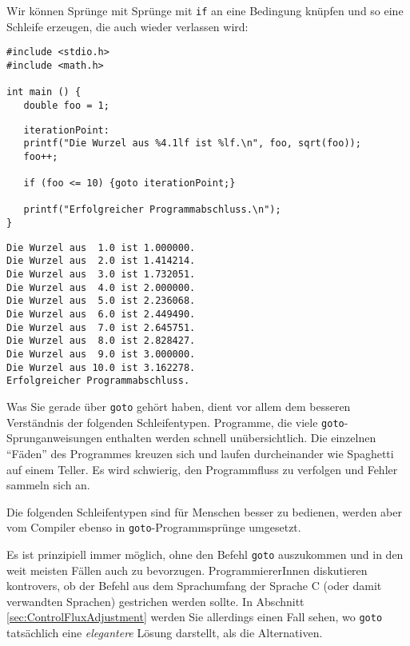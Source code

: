 Wir können Sprünge mit Sprünge mit \texttt{if} an eine Bedingung knüpfen und so eine Schleife erzeugen, die auch wieder verlassen wird:

\begin{codebox}
\begin{verbatim}
#include <stdio.h>
#include <math.h>

int main () {
   double foo = 1;
\end{verbatim}
\end{codebox}
%
\begin{codebox}[]
\begin{verbatim}
   iterationPoint:
   printf("Die Wurzel aus %4.1lf ist %lf.\n", foo, sqrt(foo));
   foo++;
   
   if (foo <= 10) {goto iterationPoint;}
   
   printf("Erfolgreicher Programmabschluss.\n");
}
\end{verbatim}
\end{codebox}

\begin{cmdbox}
\begin{verbatim}
Die Wurzel aus  1.0 ist 1.000000.
Die Wurzel aus  2.0 ist 1.414214.
Die Wurzel aus  3.0 ist 1.732051.
Die Wurzel aus  4.0 ist 2.000000.
Die Wurzel aus  5.0 ist 2.236068.
Die Wurzel aus  6.0 ist 2.449490.
Die Wurzel aus  7.0 ist 2.645751.
Die Wurzel aus  8.0 ist 2.828427.
Die Wurzel aus  9.0 ist 3.000000.
Die Wurzel aus 10.0 ist 3.162278.
Erfolgreicher Programmabschluss.
\end{verbatim}
\end{cmdbox}

\begin{warnbox}
Was Sie gerade über \texttt{goto} gehört haben, dient vor allem dem besseren Verständnis der folgenden Schleifentypen. Programme, die viele \texttt{goto}-Sprunganweisungen enthalten werden schnell unübersichtlich. Die einzelnen \enquote{Fäden} des Programmes kreuzen sich und laufen durcheinander wie Spaghetti auf einem Teller. Es wird schwierig, den Programmfluss zu verfolgen und Fehler sammeln sich an.

Die folgenden Schleifentypen sind für Menschen besser zu bedienen, werden aber vom Compiler ebenso in \texttt{goto}-Programmsprünge umgesetzt.

Es ist prinzipiell immer möglich, ohne den Befehl \texttt{goto} auszukommen und in den weit meisten Fällen auch zu bevorzugen. ProgrammiererInnen diskutieren kontrovers, ob der Befehl aus dem Sprachumfang der Sprache C (oder damit verwandten Sprachen) gestrichen werden sollte. In Abschnitt \ref{sec:ControlFluxAdjustment} werden Sie allerdings einen Fall sehen, wo \texttt{goto} tatsächlich eine \emph{elegantere} Lösung darstellt, als die Alternativen.
\end{warnbox}


